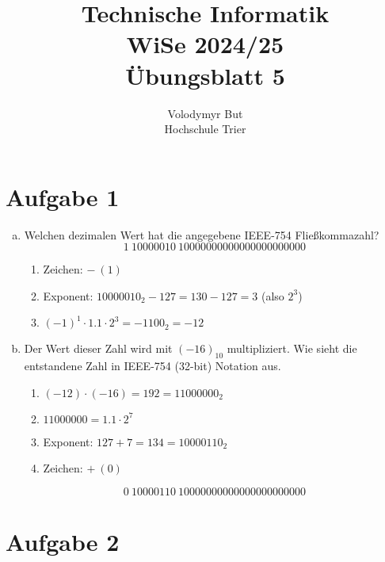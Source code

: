 \documentclass[10pt, oneside]{article}
\title{Technische Informatik\\[10pt]\Large{WiSe 2024/25}\\[15pt]\Large{{\"U}bungsblatt 5}}
\author{Volodymyr But\\[10pt]Hochschule Trier}
\date{}
\begin{document}
\maketitle
\vspace{25px}

\section{Aufgabe 1}

\begin{enumerate}[(a)]
    \item Welchen dezimalen Wert hat die angegebene IEEE-754 Flie{\ss}kommazahl?
        \begin{equation*}
            1\ 10000010\ 10000000000000000000000
        \end{equation*}
        \begin{enumerate}[1.]
            \item Zeichen: $-\ (1)$
            \item Exponent: $10000010_2 - 127 = 130 - 127 = 3$ (also $2^3$)
            \item $(-1)^1 \cdot 1.1 \cdot 2^3 = -1100_2 = -12$
        \end{enumerate}

    \item Der Wert dieser Zahl wird mit $(-16)_10$ multipliziert. Wie sieht die
        entstandene Zahl in IEEE-754 (32-bit) Notation aus.
        \begin{enumerate}[1.]
            \item $(-12) \cdot (-16) = 192 = 11000000_2$
            \item $11000000 = 1.1 \cdot 2^7$
            \item Exponent: $127 + 7 = 134 = 10000110_2$
            \item Zeichen: $+\ (0)$
        \end{enumerate}
        \begin{equation*}
            0\ 10000110\ 10000000000000000000000
        \end{equation*}
\end{enumerate}

\section{Aufgabe 2}
\end{document}
